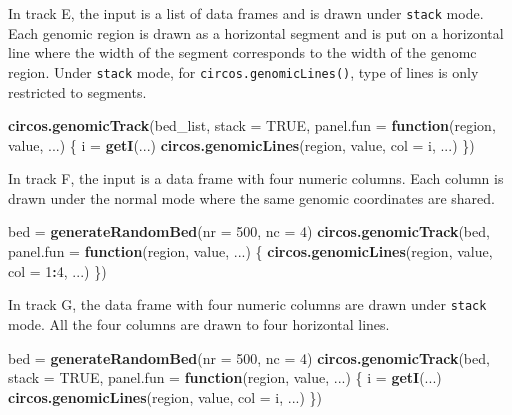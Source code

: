 \documentclass[]{book}
\newenvironment{Shaded}{\begin{snugshade}}{\end{snugshade}}
\newcommand{\KeywordTok}[1]{\textcolor[rgb]{0.13,0.29,0.53}{\textbf{#1}}}
\newcommand{\DataTypeTok}[1]{\textcolor[rgb]{0.13,0.29,0.53}{#1}}
\newcommand{\DecValTok}[1]{\textcolor[rgb]{0.00,0.00,0.81}{#1}}
\newcommand{\StringTok}[1]{\textcolor[rgb]{0.31,0.60,0.02}{#1}}
\newcommand{\OtherTok}[1]{\textcolor[rgb]{0.56,0.35,0.01}{#1}}
\newcommand{\ControlFlowTok}[1]{\textcolor[rgb]{0.13,0.29,0.53}{\textbf{#1}}}
\newcommand{\OperatorTok}[1]{\textcolor[rgb]{0.81,0.36,0.00}{\textbf{#1}}}
\newcommand{\NormalTok}[1]{#1}
\theoremstyle{definition}
\theoremstyle{definition}
\theoremstyle{remark}
\begin{document}
In track E, the input is a list of data frames and is drawn under
\texttt{stack} mode. Each genomic region is drawn as a horizontal
segment and is put on a horizontal line where the width of the segment
corresponds to the width of the genomc region. Under \texttt{stack}
mode, for \texttt{circos.genomicLines()}, type of lines is only
restricted to segments.

\begin{Shaded}
\begin{Highlighting}[]
\KeywordTok{circos.genomicTrack}\NormalTok{(bed_list, }\DataTypeTok{stack =} \OtherTok{TRUE}\NormalTok{, }
    \DataTypeTok{panel.fun =} \ControlFlowTok{function}\NormalTok{(region, value, ...) \{}
\NormalTok{        i =}\StringTok{ }\KeywordTok{getI}\NormalTok{(...)}
        \KeywordTok{circos.genomicLines}\NormalTok{(region, value, }\DataTypeTok{col =}\NormalTok{ i, ...)}
\NormalTok{\})}
\end{Highlighting}
\end{Shaded}

In track F, the input is a data frame with four numeric columns. Each
column is drawn under the normal mode where the same genomic coordinates
are shared.

\begin{Shaded}
\begin{Highlighting}[]
\NormalTok{bed =}\StringTok{ }\KeywordTok{generateRandomBed}\NormalTok{(}\DataTypeTok{nr =} \DecValTok{500}\NormalTok{, }\DataTypeTok{nc =} \DecValTok{4}\NormalTok{)}
\KeywordTok{circos.genomicTrack}\NormalTok{(bed, }
    \DataTypeTok{panel.fun =} \ControlFlowTok{function}\NormalTok{(region, value, ...) \{}
        \KeywordTok{circos.genomicLines}\NormalTok{(region, value, }\DataTypeTok{col =} \DecValTok{1}\OperatorTok{:}\DecValTok{4}\NormalTok{, ...)}
\NormalTok{\})}
\end{Highlighting}
\end{Shaded}

In track G, the data frame with four numeric columns are drawn under
\texttt{stack} mode. All the four columns are drawn to four horizontal
lines.

\begin{Shaded}
\begin{Highlighting}[]
\NormalTok{bed =}\StringTok{ }\KeywordTok{generateRandomBed}\NormalTok{(}\DataTypeTok{nr =} \DecValTok{500}\NormalTok{, }\DataTypeTok{nc =} \DecValTok{4}\NormalTok{)}
\KeywordTok{circos.genomicTrack}\NormalTok{(bed, }\DataTypeTok{stack =} \OtherTok{TRUE}\NormalTok{, }
    \DataTypeTok{panel.fun =} \ControlFlowTok{function}\NormalTok{(region, value, ...) \{}
\NormalTok{        i =}\StringTok{ }\KeywordTok{getI}\NormalTok{(...)}
        \KeywordTok{circos.genomicLines}\NormalTok{(region, value, }\DataTypeTok{col =}\NormalTok{ i, ...)}
\NormalTok{\})}
\end{Highlighting}
\end{Shaded}
\end{document}

